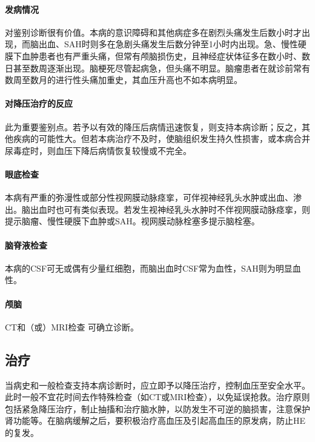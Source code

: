 \paragraph{发病情况}

对鉴别诊断很有价值。本病的意识障碍和其他病症多在剧烈头痛发生后数小时才出现，而脑出血、SAH时则多在急剧头痛发生后数分钟至1小时内出现。急、慢性硬膜下血肿患者也有严重头痛，但常有颅脑损伤史，且神经症状体征多在数小时、数日甚至数周逐渐出现。脑梗死尽管起病急，但头痛不明显。脑瘤患者在就诊前常有数周至数月的进行性头痛加重史，其血压升高也不如本病明显。

\paragraph{对降压治疗的反应}

此为重要鉴别点。若予以有效的降压后病情迅速恢复，则支持本病诊断；反之，其他疾病的可能性大。但若本病治疗不及时，使脑组织发生持久性损害，或本病合并尿毒症时，则血压下降后病情恢复较慢或不完全。

\paragraph{眼底检查}

本病有严重的弥漫性或部分性视网膜动脉痉挛，可伴视神经乳头水肿或出血、渗出。脑出血时也可有类似表现。若发生视神经乳头水肿时不伴视网膜动脉痉挛，则提示脑瘤、慢性硬膜下血肿或SAH。视网膜动脉栓塞多提示脑栓塞。

\paragraph{脑脊液检查}

本病的CSF可无或偶有少量红细胞，而脑出血时CSF常为血性，SAH则为明显血性。

\paragraph{颅脑}

CT和（或）MRI检查 可确立诊断。

\subsection{治疗}

当病史和一般检查支持本病诊断时，应立即予以降压治疗，控制血压至安全水平。此时一般不宜花时间去作特殊检查（如CT或MRI检查），以免延误抢救。治疗原则包括紧急降压治疗，制止抽搐和治疗脑水肿，以防发生不可逆的脑损害，注意保护肾功能等。在脑病缓解之后，要积极治疗高血压及引起高血压的原发病，防止HE的复发。

